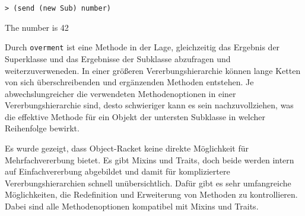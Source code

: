 \begin{lstlisting}
> (send (new Sub) number)
\end{lstlisting}
{\routput The number is 42}

Durch \texttt{overment} ist eine Methode in der Lage, gleichzeitig das Ergebnis der Superklasse und das Ergebnisse der Subklasse abzufragen und weiterzuverweneden. In einer größeren Vererbungshierarchie können  lange Ketten von sich überschreibenden und ergänzenden Methoden entstehen. Je abwechslungreicher die verwendeten Methodenoptionen in einer Vererbungshierarchie sind, desto schwieriger kann es sein nachzuvollziehen, was die effektive Methode für ein Objekt der untersten Subklasse in welcher Reihenfolge bewirkt.

Es wurde gezeigt, dass Object-Racket keine direkte Möglichkeit für Mehrfachvererbung bietet. Es gibt Mixins und Traits, doch beide werden intern auf Einfachvererbung abgebildet und damit für kompliziertere Vererbungshierarchien schnell unübersichtlich. Dafür gibt es sehr umfangreiche Möglichkeiten, die Redefinition und Erweiterung von Methoden zu kontrollieren. Dabei sind alle  Methodenoptionen kompatibel mit Mixins und Traits. 

